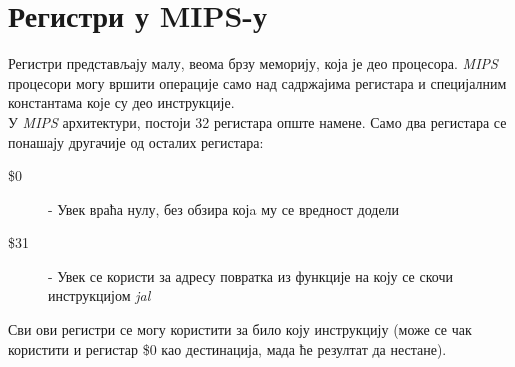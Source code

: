\documentclass[12pt,oneside]{memoir}
\begin{document}
\section{Регистри у MIPS-у}
\label{registri}

\indent Регистри представљају малу, веома брзу меморију, која је део процесора. \textit{MIPS} процесори могу вршити операције само над садржајима регистара и специјалним константама које су део инструкције. \\
\indent У \textit{MIPS} архитектури, постоји 32 регистара опште намене. Само два регистара се понашају другачије од осталих регистара:

\begin{description}
  \item[\$0] - Увек враћа нулу, без обзира којa му се вредност додели
  \item [\$31] - Увек се користи за адресу повратка из функције на коју се скочи инструкцијом \textit{jal}
\end{description}
Сви ови регистри се могу користити за било коју инструкцију (може се чак користити и регистар \$0 као дестинација, мада ће резултат да нестане). 
\end{document}
